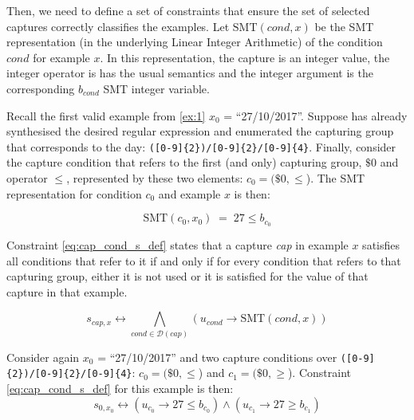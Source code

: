 Then, we need to define a set of constraints that ensure the set of selected captures correctly classifies the examples.
Let \(\textrm{SMT}(\textit{cond}, x)\) be the \ac{SMT} representation (in the underlying Linear Integer Arithmetic) of the condition \(\textit{cond}\) for example \(x\).
In this representation, the capture is an integer value, the integer operator is has the usual semantics and the integer argument is the corresponding \(b_{\textit{cond}}\) \ac{SMT} integer variable.

\begin{example}
Recall the first valid example from \autoref{ex:1} \(x_0\) = ``27/10/2017''.
%
Suppose \Forest has already synthesised the desired regular expression and enumerated the capturing group that corresponds to the day: \verb`([0-9]{2})/[0-9]{2}/[0-9]{4}`. 
%
Finally, consider the capture condition that refers to the first (and only) capturing group, \(\$0\) and operator \(\le\), represented by these two elements: \(c_0 = (\$0, \le\)).
%
The SMT representation for condition \(c_0\) and example \(x\) is then:

\[\textrm{SMT}(c_0, x_0)\; =\;  27 \le b_{c_0}\]
\end{example}

Constraint \ref{eq:cap_cond_s_def} states that a capture \textit{cap} in example \(x\) satisfies all conditions that refer to it if and only if for every condition that refers to that capturing group, either it is not used or it is satisfied for the value of that capture in that example.

\begin{equation}\label{eq:cap_cond_s_def}
    s_{cap,x} \leftrightarrow \bigwedge_{cond \in \mathcal{D}(cap)} (u_{cond} \rightarrow \textrm{SMT}(\textit{cond}, x))
\end{equation}

\begin{example}
Consider again \(x_0\) = ``27/10/2017'' and two capture conditions over \verb`([0-9]{2})/[0-9]{2}/[0-9]{4}`: \(c_0 = (\$0, \le\)) and \(c_1 = (\$0, \ge\)). Constraint \eqref{eq:cap_cond_s_def} for this example is then:
%
\begin{equation*}
    s_{0,x_0} \leftrightarrow (u_{c_0} \rightarrow 27 \le b_{c_0}) 
    \land (u_{c_1} \rightarrow 27 \ge b_{c_1})
\end{equation*}

\end{example}

